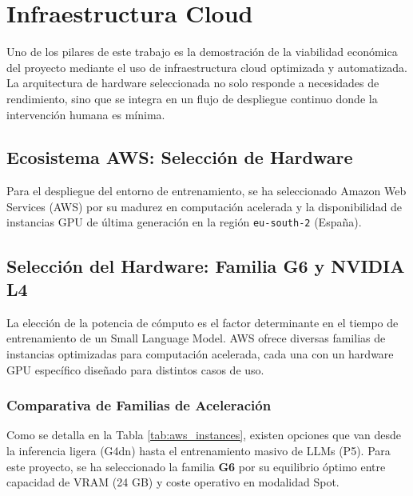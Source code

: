 \section{Infraestructura Cloud}
\label{sec:infraestructura}

Uno de los pilares de este trabajo es la demostración de la viabilidad económica del proyecto mediante el uso de infraestructura cloud optimizada y automatizada. La arquitectura de hardware seleccionada no solo responde a necesidades de rendimiento, sino que se integra en un flujo de despliegue continuo donde la intervención humana es mínima.

\subsection{Ecosistema AWS: Selección de Hardware}
Para el despliegue del entorno de entrenamiento, se ha seleccionado Amazon Web Services (AWS) por su madurez en computación acelerada y la disponibilidad de instancias GPU de última generación en la región \texttt{eu-south-2} (España).

\subsection{Selección del Hardware: Familia G6 y NVIDIA L4}
La elección de la potencia de cómputo es el factor determinante en el tiempo de entrenamiento de un Small Language Model. AWS ofrece diversas familias de instancias optimizadas para computación acelerada, cada una con un hardware GPU específico diseñado para distintos casos de uso.

\subsubsection{Comparativa de Familias de Aceleración}
Como se detalla en la Tabla \ref{tab:aws_instances}, existen opciones que van desde la inferencia ligera (G4dn) hasta el entrenamiento masivo de LLMs (P5). Para este proyecto, se ha seleccionado la familia \textbf{G6} por su equilibrio óptimo entre capacidad de VRAM (24 GB) y coste operativo en modalidad Spot.

